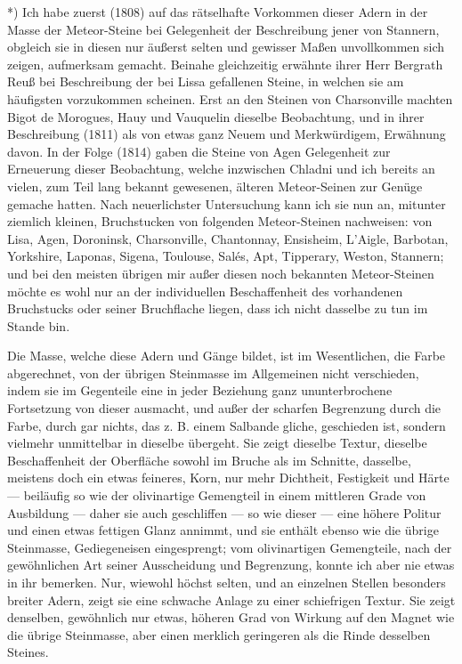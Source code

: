 \documentclass[a4paper, 11pt, oneside, german]{article}
\begin{document}
*) Ich habe zuerst (1808) auf das rätselhafte Vorkommen dieser Adern in der Masse der Meteor-Steine bei Gelegenheit der Beschreibung jener von Stannern, obgleich sie in diesen nur äußerst selten und gewisser Maßen unvollkommen sich zeigen, aufmerksam gemacht. Beinahe gleichzeitig erwähnte ihrer Herr Bergrath Reuß bei Beschreibung der bei Lissa gefallenen Steine, in welchen sie am häufigsten vorzukommen scheinen. Erst an den Steinen von Charsonville machten Bigot de Morogues, Hauy und Vauquelin dieselbe Beobachtung, und in ihrer Beschreibung (1811) als von etwas ganz Neuem und Merkwürdigem, Erwähnung davon. In der Folge (1814) gaben die Steine von Agen Gelegenheit zur Erneuerung dieser Beobachtung, welche inzwischen Chladni und ich bereits an vielen, zum Teil lang bekannt gewesenen, älteren Meteor-Seinen zur Genüge gemache hatten. Nach neuerlichster Untersuchung kann ich sie nun an, mitunter ziemlich kleinen, Bruchstucken von folgenden Meteor-Steinen nachweisen: von Lisa, Agen, Doroninsk, Charsonville, Chantonnay, Ensisheim, L'Aigle, Barbotan, Yorkshire, Laponas, Sigena, Toulouse, Salés, Apt, Tipperary, Weston, Stannern; und bei den meisten übrigen mir außer diesen noch bekannten Meteor-Steinen möchte es wohl nur an der individuellen Beschaffenheit des vorhandenen Bruchstucks oder seiner Bruchflache liegen, dass ich nicht dasselbe zu tun im Stande bin.

Die Masse, welche diese Adern und Gänge bildet, ist im Wesentlichen, die Farbe abgerechnet, von der übrigen Steinmasse im Allgemeinen nicht verschieden, indem sie im Gegenteile eine in jeder Beziehung ganz ununterbrochene Fortsetzung von dieser ausmacht, und außer der scharfen Begrenzung durch die Farbe, durch gar nichts, das z. B. einem Salbande gliche, geschieden ist, sondern vielmehr unmittelbar in dieselbe übergeht. Sie zeigt dieselbe Textur, dieselbe Beschaffenheit der Oberfläche sowohl im Bruche als im Schnitte, dasselbe, meistens doch ein etwas feineres, Korn, nur mehr Dichtheit, Festigkeit und Härte --- beiläufig so wie der olivinartige Gemengteil in einem mittleren Grade von Ausbildung --- daher sie auch geschliffen --- so wie dieser --- eine höhere Politur und einen etwas fettigen Glanz annimmt, und sie enthält ebenso wie die übrige Steinmasse, Gediegeneisen eingesprengt; vom olivinartigen Gemengteile, nach der gewöhnlichen Art seiner Ausscheidung und Begrenzung, konnte ich aber nie etwas in ihr bemerken. Nur, wiewohl höchst selten, und an einzelnen Stellen besonders breiter Adern, zeigt sie eine schwache Anlage zu einer schiefrigen Textur. Sie zeigt denselben, gewöhnlich nur etwas, höheren Grad von Wirkung auf den Magnet wie die übrige Steinmasse, aber einen merklich geringeren als die Rinde desselben Steines.
\end{document}

